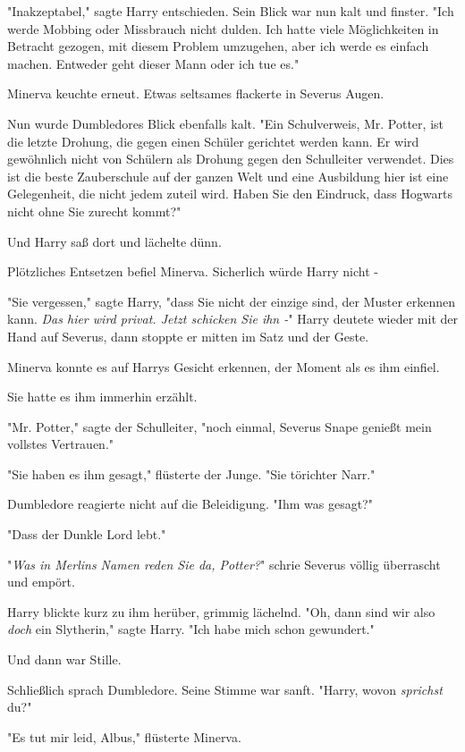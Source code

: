 {"Inakzeptabel," sagte Harry entschieden. Sein Blick war nun kalt und finster. "Ich werde Mobbing oder Missbrauch nicht dulden. Ich hatte viele Möglichkeiten in Betracht gezogen, mit diesem Problem umzugehen, aber ich werde es einfach machen. Entweder geht dieser Mann oder ich tue es."

Minerva keuchte erneut. Etwas seltsames flackerte in Severus Augen.

Nun wurde Dumbledores Blick ebenfalls kalt. "Ein Schulverweis, Mr. Potter, ist die letzte Drohung, die gegen einen Schüler gerichtet werden kann. Er wird gewöhnlich nicht von Schülern als Drohung gegen den Schulleiter verwendet. Dies ist die beste Zauberschule auf der ganzen Welt und eine Ausbildung hier ist eine Gelegenheit, die nicht jedem zuteil wird. Haben Sie den Eindruck, dass Hogwarts nicht ohne Sie zurecht kommt?"

Und Harry saß dort und lächelte dünn.

Plötzliches Entsetzen befiel Minerva. Sicherlich würde Harry nicht -

"Sie vergessen," sagte Harry, "dass Sie nicht der einzige sind, der Muster erkennen kann. \emph{Das hier wird privat. Jetzt schicken Sie ihn -}" Harry deutete wieder mit der Hand auf Severus, dann stoppte er mitten im Satz und der Geste.

Minerva konnte es auf Harrys Gesicht erkennen, der Moment als es ihm einfiel.

Sie hatte es ihm immerhin erzählt.

"Mr. Potter," sagte der Schulleiter, "noch einmal, Severus Snape genießt mein vollstes Vertrauen."

"Sie haben es ihm gesagt," flüsterte der Junge. "Sie törichter Narr."

Dumbledore reagierte nicht auf die Beleidigung. "Ihm was gesagt?"

"Dass der Dunkle Lord lebt."

"\emph{Was in Merlins Namen reden Sie da, Potter?}" schrie Severus völlig überrascht und empört.

Harry blickte kurz zu ihm herüber, grimmig lächelnd. "Oh, dann sind wir also \emph{doch} ein Slytherin," sagte Harry. "Ich habe mich schon gewundert."

Und dann war Stille.

Schließlich sprach Dumbledore. Seine Stimme war sanft. "Harry, wovon \emph{sprichst} du?"

"Es tut mir leid, Albus," flüsterte Minerva.

}
